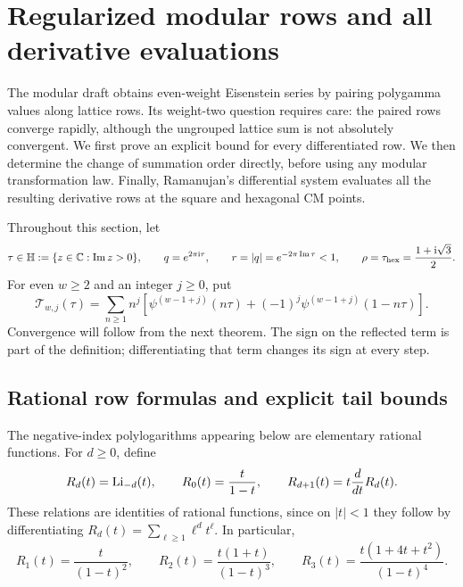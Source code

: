 \section{Regularized modular rows and all derivative evaluations}
\label{sec:modular}

The modular draft obtains even-weight Eisenstein series by pairing
polygamma values along lattice rows. Its weight-two question requires
care: the paired rows converge rapidly, although the ungrouped lattice
sum is not absolutely convergent. We first prove an explicit bound for
every differentiated row. We then determine the change of summation
order directly, before using any modular transformation law. Finally,
Ramanujan's differential system evaluates all the resulting derivative
rows at the square and hexagonal CM points.

Throughout this section, let
\[
\tau\in\mathbb H:=\{z\in\mathbb{C}:\operatorname{Im} z>0\},\qquad
q=e^{2\pi\mathrm{i}\tau},\qquad r=|q|=e^{-2\pi\operatorname{Im}\tau}<1,
\qquad \rho=\tau_{\mathrm{hex}}=\frac{1+\mathrm{i}\sqrt3}{2}.
\]
For even \(w\ge2\) and an integer \(j\ge0\), put
\begin{equation}
\mathcal T_{w,j}(\tau)
=\sum_{n\ge1}n^j\left[
 \psi^{(w-1+j)}(n\tau)
 +(-1)^j\psi^{(w-1+j)}(1-n\tau)\right].
\label{eq:modular-T-definition}
\end{equation}
Convergence will follow from the next theorem. The sign on the reflected
term is part of the definition; differentiating that term changes its
sign at every step.

\subsection{Rational row formulas and explicit tail bounds}

The negative-index polylogarithms appearing below are elementary
rational functions. For \(d\ge0\), define
\[
R_d(t)=\operatorname{Li}_{-d}(t),\qquad
R_0(t)=\frac{t}{1-t},\qquad
R_{d+1}(t)=t\frac{d}{dt}R_d(t).
\]
These relations are identities of rational functions, since on
\(|t|<1\) they follow by differentiating
\(R_d(t)=\sum_{\ell\ge1}\ell^d t^\ell\). In particular,
\[
R_1(t)=\frac{t}{(1-t)^2},\qquad
R_2(t)=\frac{t(1+t)}{(1-t)^3},\qquad
R_3(t)=\frac{t(1+4t+t^2)}{(1-t)^4}.
\]

